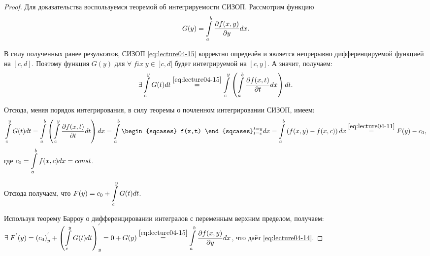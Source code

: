 \begin{proof}
	Для доказательства воспользуемся теоремой об интегрируемости СИЗОП. Рассмотрим функцию
	\begin{equation}
	\label{eq:lecture04-15}
	G(y) = \displaystyle\int\limits_a^b \dfrac{\partial f(x,y)}{\partial y} dx.
	\end{equation}

	В силу полученных ранее результатов, СИЗОП \eqref{eq:lecture04-15} корректно определён и является непрерывно дифференцируемой функцией на $[c,d]$. Поэтому функция $G(y)$ для $\forall \; fix \; y \in \; ]c,d[$ будет интегрируемой на $[c,y]$. А значит, получаем:
	\begin{equation*}
	\exists \displaystyle\int\limits_c^y G(t)dt \overset{\eqref{eq:lecture04-15}}{=} \displaystyle\int\limits_c^y \left(\displaystyle\int\limits_a^b  \dfrac{\partial f(x,t)}{\partial t} dx \right) dt.
	\end{equation*}

	Отсюда, меняя порядок интегрирования, в силу теоремы о почленном интегрировании СИЗОП, имеем:
	\begin{equation*}
	\dintl_c^y G(t)dt = \dintl_a^b \left(\dintl_c^y \dfrac{\partial f(x,t)}{\partial t} dt\right) dx = \dintl_a^b \begin{sqcases} f(x,t) \end{sqcases}_{t = c}^{t = y}dx = \dintl_a^b \left(f(x,y) - f(x,c)\right) dx \overset{\eqref{eq:lecture04-11}}{=} F(y) - c_0,
	\end{equation*}
	где $c_0 = \displaystyle\int\limits_a^b f(x,c)dx = const$.

	Отсюда получаем, что $F(y) = c_0 + \displaystyle\int\limits_c^y G(t)dt$.

	Используя теорему Барроу о дифференцировании интегралов с переменным верхним пределом, получаем: \newline	 $\exists \; F^{'}(y) = \left(c_0\right)^{'}_{y} + \left(\displaystyle\int\limits_c^y G(t) dt\right)^{'}_{y} = 0 + G(y) \overset{\eqref{eq:lecture04-15}}{=} \displaystyle\int\limits_a^b \dfrac{\partial f(x,y)}{\partial y} dx$, что даёт \eqref{eq:lecture04-14}.
\end{proof}
